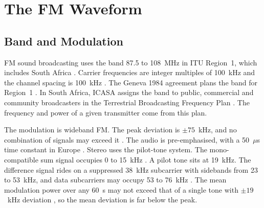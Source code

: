 \section{The FM Waveform}
\label{sec:th.fm}
\todo{}
\subsection{Band and Modulation}
\label{subsec:th.fm.waveform}
\todo{}
FM sound broadcasting uses the band 87.5 to 108~MHz in ITU Region~1, which includes South Africa \citep{itu_bs412}. Carrier frequencies are integer multiples of 100~kHz and the channel spacing is 100~kHz \citep{itu_bs412}. The Geneva 1984 agreement plans the band for Region~1 \citep{itu_ge84}. In South Africa, ICASA assigns the band to public, commercial and community broadcasters in the Terrestrial Broadcasting Frequency Plan \citep{icasa_tbfp2013}. The frequency and power of a given transmitter come from this plan.

The modulation is wideband FM. The peak deviation is $\pm 75$~kHz, and no combination of signals may exceed it \citep{itu_bs450}. The audio is pre-emphasised, with a 50~$\mu$s time constant in Europe \citep{itu_bs450} . Stereo uses the pilot-tone system. The mono-compatible sum signal occupies 0 to 15~kHz \citep{lauri2007}. A pilot tone sits at 19~kHz. The difference signal rides on a suppressed 38~kHz subcarrier with sidebands from 23 to 53~kHz, and data subcarriers may occupy 53 to 76~kHz \citep{itu_bs450}. The mean modulation power over any 60~s may not exceed that of a single tone with $\pm 19$~kHz deviation \citep{itu_bs412}, so the mean deviation is far below the peak.

